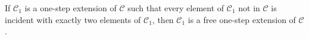 If $\mathcal{C}_1$ is a one-step extension of $\mathcal{C}$ such that every element of $\mathcal{C}_1$ not in $\mathcal{C}$ is incident with exactly two elements of $\mathcal{C}_1$, then $\mathcal{C}_1$ is a free one-step extension of $\mathcal{C}$.
